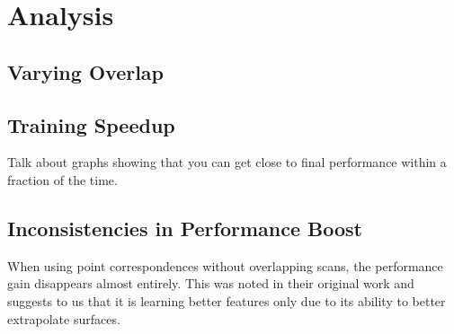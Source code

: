 \documentclass[10pt,twocolumn,letterpaper]{article}
\begin{document}
\begin{table}
    \centering
    \caption{\textbf{Object Detection using VoteNet (mAP)}}
    \label{table:scannetObjectDetection}
\end{table}

\section{Analysis}
\label{sec:analysis}

\subsection{Varying Overlap}
\label{sec:results:varying}

\subsection{Training Speedup}
\label{sec:results:speedup}

Talk about graphs showing that you can get close to final performance within a fraction of the time.

\subsection{Inconsistencies in Performance Boost}
\label{sec:results:inconsistencies}

When using point correspondences without overlapping scans, the performance gain disappears almost entirely. This was noted in their original work and suggests to us that it is learning better features only due to its ability to better extrapolate surfaces.
\end{document}
